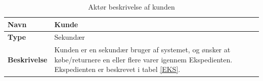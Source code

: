 \begin{table}[H]
	\label{KD}
	\begin{tabularx}{\textwidth}{|l|X|}
		\hline
		\textbf{Navn} & Kunde \\
		\hline
		\textbf{Type} & Sekundær \\
		\hline
		\textbf{Beskrivelse} & Kunden er en sekundær bruger af systemet, og ønsker at købe/returnere en eller flere varer igennem Ekspedienten. Ekspedienten er beskrevet i tabel \ref{EKS}.   \\
		\hline
	\end{tabularx}
	\captionsetup{justification=raggedright,singlelinecheck=false}
	\caption{Aktør beskrivelse af kunden}
	\label{tab:AktKu}
\end{table}


